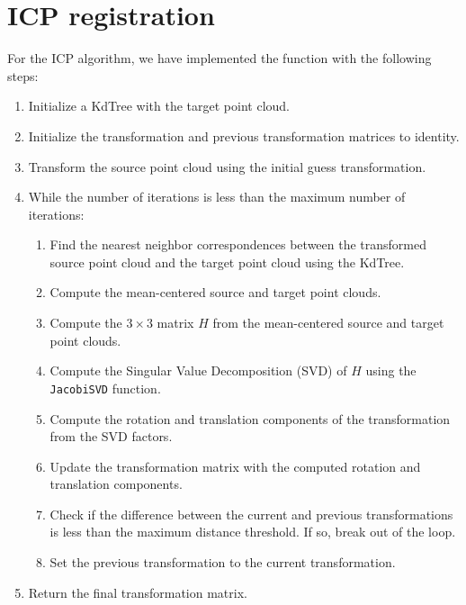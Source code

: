 \section{ICP registration}
For the ICP algorithm, we have implemented the function with the following steps:
\begin{enumerate}
    \item Initialize a KdTree with the target point cloud.
    \item Initialize the transformation and previous transformation matrices to identity.
    \item Transform the source point cloud using the initial guess transformation.
    \item While the number of iterations is less than the maximum number of iterations: 
    \begin{enumerate}
        \item Find the nearest neighbor correspondences between the transformed source point cloud and the target point cloud using the KdTree. 
        \item Compute the mean-centered source and target point clouds. 
        \item Compute the $3 \times 3$ matrix $H$ from the mean-centered source and target point clouds. 
        \item Compute the Singular Value Decomposition (SVD) of $H$ using the \texttt{JacobiSVD} function. 
        \item Compute the rotation and translation components of the transformation from the SVD factors. 
        \item Update the transformation matrix with the computed rotation and translation components. 
        \item Check if the difference between the current and previous transformations is less than the maximum distance threshold. If so, break out of the loop. 
        \item Set the previous transformation to the current transformation.
    \end{enumerate}
    \item Return the final transformation matrix.
\end{enumerate}